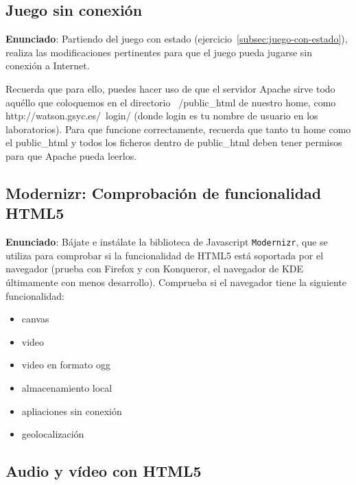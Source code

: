 \subsection{Juego sin conexión}
\label{subsec:juego-sin-conexion}

\textbf{Enunciado}: Partiendo del juego con estado (ejercicio~\ref{subsec:juego-con-estado}), realiza las modificaciones pertinentes para que el juego pueda jugarse sin conexión a Internet.

Recuerda que para ello, puedes hacer uso de que el servidor Apache sirve todo aquéllo que coloquemos en el directorio ~/public\_html de nuestro home, como http://watson.gsyc.es/~login/ (donde login es tu nombre de usuario en los laboratorios). Para que funcione correctamente, recuerda que tanto tu home como el public\_html y todos los ficheros dentro de public\_html deben tener permisos para que Apache pueda leerlos.

\subsection{Modernizr: Comprobación de funcionalidad HTML5}
\label{subsec:modernizr}

\textbf{Enunciado}: Bájate e instálate la biblioteca de Javascript \texttt{Modernizr}, que se utiliza para comprobar si la funcionalidad de HTML5 está soportada por el navegador (prueba con Firefox y con Konqueror, el navegador de KDE últimamente con menos desarrollo). Comprueba si el navegador tiene la siguiente funcionalidad:

\begin{itemize}
  \item canvas
  \item video
  \item video en formato ogg
  \item almacenamiento local
  \item apliaciones sin conexión
  \item geolocalización
\end{itemize}  


\subsection{Audio y vídeo con HTML5}
\label{subsec:audio-video}

